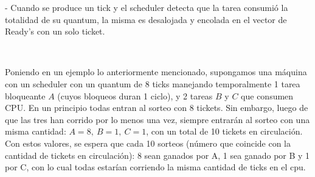 - Cuando se produce un tick y el scheduler detecta que la tarea consumió la totalidad de su quantum, la misma es desalojada y encolada en el vector de Ready's con un solo ticket.

~


Poniendo en un ejemplo lo anteriormente mencionado, supongamos una máquina con un scheduler con
un quantum de 8 ticks manejando temporalmente 
1 tarea bloqueante $A$ (cuyos bloqueos duran 1 ciclo), y 2 tareas $B$ y $C$ que consumen CPU. En un principio todas entran al sorteo con 8
tickets. Sin embargo, luego de que las tres han corrido por lo menos una vez, siempre entrarán al sorteo con una misma cantidad: $A=8, \ B=1, \ C=1$, con un total de
10 tickets en circulación. Con estos valores, se espera que cada 10 sorteos (número que coincide con la cantidad de tickets en circulación): 8 sean ganados por A,
1 sea ganado por B y 1 por C, con lo cual todas estarían corriendo la misma cantidad de ticks en el cpu. 




 
